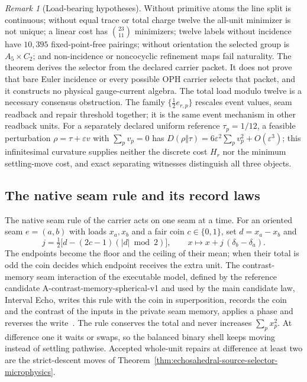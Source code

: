 \documentclass[11pt]{article}
\theoremstyle{remark}
\newtheorem{remark}[theorem]{Remark}
\theoremstyle{plain}
\begin{document}
\begin{remark}[Load-bearing hypotheses]
Without primitive atoms the line split is continuous; without equal trace or
total charge twelve the all-unit minimizer is not unique; a linear cost has
\(\binom{23}{11}\) minimizers; twelve labels without incidence have
\(10{,}395\) fixed-point-free pairings; without orientation the selected group
is \(A_5\times C_2\); and non-incidence or noncocyclic refinement maps fail
naturality. The theorem derives the selector from the declared carrier
packet. It does not prove that bare Euler incidence or every possible OPH
carrier selects that packet, and it constructs no physical gauge-current
algebra. The total load modulo twelve is a necessary consensus obstruction.
The family \(\{\tfrac12 e_{r,p}\}\) rescales event values, seam readback and
repair threshold together; it is the same event mechanism in other readback
units. For a separately declared uniform reference \(\tau_p=1/12\), a
feasible perturbation \(\rho=\tau+\varepsilon v\) with \(\sum_pv_p=0\) has
\(D(\rho\Vert\tau)=6\varepsilon^2\sum_pv_p^2+O(\varepsilon^3)\); this
infinitesimal curvature supplies neither the discrete cost \(H_r\) nor the
minimum settling-move cost, and exact separating witnesses distinguish all
three objects.
\end{remark}

\subsection{The native seam rule and its record laws}
\label{subsec:native-seam-rule}

The native seam rule of the carrier acts on one seam at a time. For an
oriented seam \(e=(a,b)\) with loads \(x_a,x_b\) and a
fair coin \(c\in\{0,1\}\), set \(d=x_a-x_b\) and
\[
j=\tfrac12\bigl[d-(2c-1)(|d|\bmod2)\bigr],\qquad
x\longmapsto x+j\,(\delta_b-\delta_a).
\]
The endpoints become the floor and the ceiling of their mean; when their
total is odd the coin decides which endpoint receives the extra unit. The
contrast-memory seam interaction of the executable model, defined by the
reference candidate A-contrast-memory-spherical-v1 and used by the main
candidate law, Interval Echo, writes this rule with the coin in
superposition, records the coin and the contrast of the inputs in the
private seam memory, applies a phase and reverses the write~\cite{ophmodel}.
The rule conserves the total and never increases \(\sum_px_p^2\). At difference
one it waits or swaps, so the balanced binary shell keeps moving instead of
settling pathwise. Accepted whole-unit repairs at difference at least two
are the strict-descent moves of
Theorem~\ref{thm:echosahedral-source-selector-microphysics}.
\end{document}
